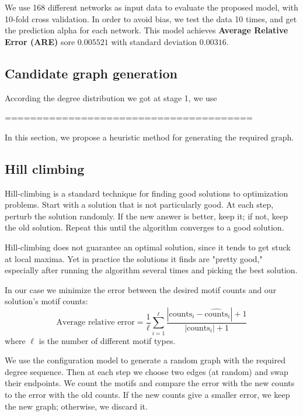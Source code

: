  We use 168 different networks as input data to evaluate the proposed model, with 10-fold cross validation. In order to avoid bias, we test the data 10 times, and get the prediction alpha for each network. This model achieves \textbf{Average Relative Error (ARE)} sore $0.005521$ with standard deviation $0.00316$.

\subsection{Candidate graph generation}

According the degree distribution we got at stage 1, we use 


=======================================

In this section, we propose a heuristic method for generating the required
graph.

\subsection{Hill climbing}
Hill-climbing is a standard technique for finding good solutions to optimization problems.  Start with a solution that is not particularly good.  At each step, perturb the solution randomly.  If the new answer is better, keep it; if not, keep the old solution.  Repeat this until the algorithm converges to a good solution.

Hill-climbing does not guarantee an optimal solution, since it tends to get stuck at local maxima.  Yet in practice the solutions it finds are "pretty good," especially after running the algorithm several times and picking the best solution.

In our case we minimize the error between the desired motif counts and our solution's motif counts:
\begin{equation}
\label{eqn:avgRelativeError}
\mbox{Average relative error} = \frac{1}{\ell} \sum_{i = 1}^{\ell} \frac{|\mbox{counts}_i - \widehat{\mbox{counts}}_i| + 1}{|\mbox{counts}_i| + 1}
\end{equation}
where $\ell$ is the number of different motif types.

We use the configuration model to generate a random graph with the required degree sequence.  Then at each step we choose two edges (at random) and swap their endpoints.  We count the motifs and compare the error with the new counts to the error with the old counts.  If the new counts give a smaller error, we keep the new graph; otherwise, we discard it.

